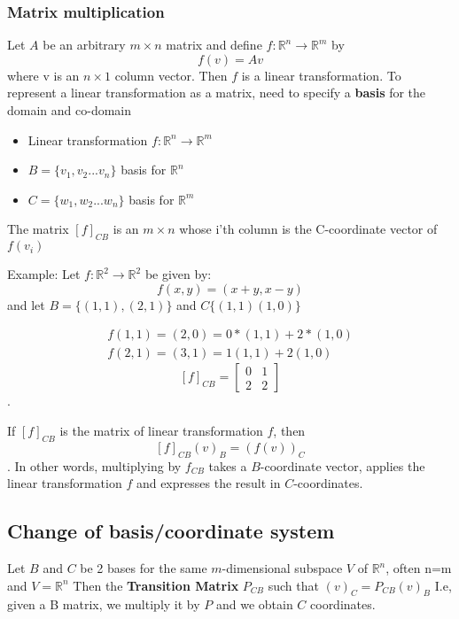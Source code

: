 \documentclass[11pt]{book}
\begin{document}
{{\subsubsection{Matrix multiplication}
\par{Let $A$ be an arbitrary  $m\times n$ matrix and define $f:\mathbb{R}^{n}\to\mathbb{R}^{m}$ by \[
f\left(v\right)=Av
\] where v is an $n\times 1$ column vector. Then $f$ is a linear transformation. To represent a linear transformation as a matrix, need to specify a  \textbf{basis} for the domain and co-domain
\begin{itemize}
	\item{Linear transformation $f: \mathbb{R}^{n}\to\mathbb{R}^{m}$}
	\item{$B=\lbrace v_{1},v_{2}...v_{n}\rbrace$ basis for $\mathbb{R}^{n}$}
	\item{$C=\lbrace w_{1},w_{2}...w_{n}\rbrace$ basis for $\mathbb{R}^{m}$}
\end{itemize}
The matrix $\left[f\right]_{CB}$ is an $m\times n$ whose i'th column is the C-coordinate vector of $f\left(v_{i}\right)$
 
Example: 
Let $f:\mathbb{R}^{2}\to\mathbb{R}^{2}$ be given by: \[
f\left(x,y\right)=\left(x+y,x-y\right)
\] and let $B=\lbrace\left(1,1\right),\left(2,1\right)\rbrace$ and $C\lbrace\left(1,1\right)\left(1,0\right)\rbrace$
}
\begin{align*}
	f\left(1,1\right)= \left(2,0\right)=0*\left(1,1\right)+2*\left(1,0\right) \\
	f\left(2,1\right)=\left(3,1\right)=1\left(1,1\right)+2\left(1,0\right)
\end{align*}
\[
\left[f\right]_{CB}=\left[
\begin{matrix}
	0 & 1 \\ 2 & 2
\end{matrix}\right]
\].

If $\left[f\right]_{CB}$ is the matrix of linear transformation $f$, then \[
\left[f\right]_{CB}\left(v\right)_{B}=\left(f\left(v\right)\right)_{C}
\] . In other words, multiplying by $f_{CB}$ takes a $B$-coordinate vector, applies the linear transformation  $f$ and expresses the result in  $C$-coordinates.

\subsection{Change of basis/coordinate system}
\par{Let $B$ and  $C$ be 2 bases for the same  $m$-dimensional subspace $V$ of  $\mathbb{R}^{n}$, often n=m and $V=\mathbb{R}^{n}$ Then the \textbf{Transition Matrix} $P_{CB}$ such that $\left(v\right)_{C}=P_{CB}\left(v\right)_{B}$ I.e, given a B matrix, we multiply it by $P$ and we obtain  $C$ coordinates.

}}}
\end{document}

